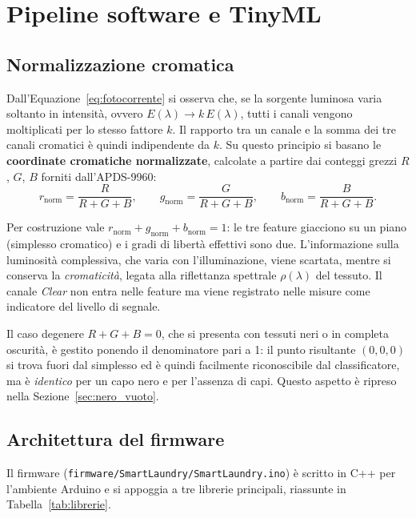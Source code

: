 \documentclass[11pt,a4paper,twoside,openany]{report}
\newcommand{\rn}{r_{\mathrm{norm}}}
\newcommand{\gn}{g_{\mathrm{norm}}}
\newcommand{\bn}{b_{\mathrm{norm}}}
\begin{document}
\chapter{Pipeline software e TinyML}
\label{ch:software}

\section{Normalizzazione cromatica}
\label{sec:normalizzazione}

Dall'Equazione~\eqref{eq:fotocorrente} si osserva che, se la sorgente
luminosa varia soltanto in intensità, ovvero $E(\lambda) \rightarrow
k\,E(\lambda)$, tutti i canali vengono moltiplicati per lo stesso fattore
$k$. Il rapporto tra un canale e la somma dei tre canali cromatici è
quindi indipendente da $k$. Su questo principio si basano le
\textbf{coordinate cromatiche normalizzate}, calcolate a partire dai
conteggi grezzi $R$, $G$, $B$ forniti dall'APDS-9960:
\begin{equation}
  \rn = \frac{R}{R+G+B}, \qquad
  \gn = \frac{G}{R+G+B}, \qquad
  \bn = \frac{B}{R+G+B}.
  \label{eq:norm}
\end{equation}

Per costruzione vale $\rn + \gn + \bn = 1$: le tre feature giacciono su
un piano (simplesso cromatico) e i gradi di libertà effettivi sono due.
L'informazione sulla luminosità complessiva, che varia con
l'illuminazione, viene scartata, mentre si conserva la
\textit{cromaticità}, legata alla riflettanza spettrale $\rho(\lambda)$
del tessuto. Il canale \textit{Clear} non entra nelle feature ma viene
registrato nelle misure come indicatore del livello di segnale.

Il caso degenere $R+G+B = 0$, che si presenta con tessuti neri o in
completa oscurità, è gestito ponendo il denominatore pari a 1: il punto
risultante $(0,0,0)$ si trova fuori dal simplesso ed è quindi
facilmente riconoscibile dal classificatore, ma è \emph{identico} per un
capo nero e per l'assenza di capi. Questo aspetto è ripreso nella
Sezione~\ref{sec:nero_vuoto}.

\section{Architettura del firmware}

Il firmware (\texttt{firmware/SmartLaundry/SmartLaundry.ino}) è scritto
in C++ per l'ambiente Arduino e si appoggia a tre librerie principali,
riassunte in Tabella~\ref{tab:librerie}.
\end{document}
